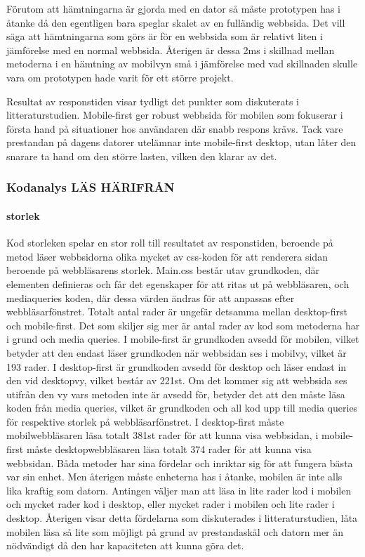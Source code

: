 \documentclass[11pt]{article}
\begin{document}
Förutom att hämtningarna är gjorda med en dator så måste prototypen has i åtanke då den egentligen bara speglar skalet av en fulländig webbsida. Det vill säga att hämtningarna som görs är för en webbsida som är relativt liten i jämförelse med en normal webbsida. Återigen är dessa 2ms i skillnad mellan metoderna i en hämtning av mobilvyn små i jämförelse med vad skillnaden skulle vara om prototypen hade varit för ett större projekt.

Resultat av responstiden visar tydligt det punkter som diskuterats i litteraturstudien. Mobile-first ger robust webbsida för mobilen som fokuserar i första hand på situationer hos användaren där snabb respons krävs. Tack vare prestandan på dagens datorer utelämnar inte mobile-first desktop, utan låter den snarare ta hand om den större lasten, vilken den klarar av det.
\newpage
\subsubsection{Kodanalys LÄS HÄRIFRÅN}
\paragraph{storlek}\mbox{}

Kod storleken spelar en stor roll till resultatet av responstiden, beroende på metod läser webbsidorna olika mycket av css-koden för att renderera sidan beroende på webbläsarens storlek. Main.css består utav grundkoden, där elementen definieras och får det egenskaper för att ritas ut på webbläsaren, och mediaqueries koden, där dessa värden ändras för att anpassas efter webbläsarfönstret. Totalt antal rader är ungefär detsamma mellan desktop-first och mobile-first. Det som skiljer sig mer är antal rader av kod som metoderna har i grund och media queries. I mobile-first är grundkoden avsedd för mobilen, vilket betyder att den endast läser grundkoden när webbsidan ses i mobilvy, vilket är 193 rader. I desktop-first är grundkoden avsedd för desktop och läser endast in den vid desktopvy, vilket består av 221st. Om det kommer sig att webbsida ses utifrån den vy vars metoden inte är avsedd för, betyder det att den måste läsa koden från media queries, vilket är grundkoden och all kod upp till media queries för respektive storlek på webbläsarfönstret. I desktop-first måste mobilwebbläsaren läsa totalt 381st rader för att kunna visa webbsidan, i mobile-first måste desktopwebbläsaren läsa totalt 374 rader för att kunna visa webbsidan. Båda metoder har sina fördelar och inriktar sig för att fungera bästa var sin enhet. Men återigen måste enheterna has i åtanke, mobilen är inte alls lika kraftig som datorn. Antingen väljer man att läsa in lite rader kod i mobilen och mycket rader kod i desktop, eller mycket rader i mobilen och lite rader i desktop. Återigen visar detta fördelarna som diskuterades i litteraturstudien, låta mobilen läsa så lite som möjligt på grund av prestandaskäl och datorn mer än nödvändigt då den har kapaciteten att kunna göra det. 
\end{document}
